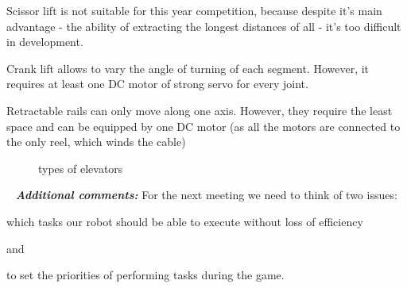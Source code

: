\begin{enumerate*}
		Scissor lift is not suitable for this year competition, because despite it's main advantage - the ability of extracting the longest distances of all - it's too difficult in development.
		
		Crank lift allows to vary the angle of turning of each segment. However, it requires at least one DC motor of strong servo for every joint.
		
		Retractable rails can only move along one axis. However, they require the least space and can be equipped by one DC motor (as all the motors are connected to the only reel, which winds the cable)
		\begin{figure}[H]
			\begin{minipage}[h]{1\linewidth}
				\caption{types of elevators}
			\end{minipage}
		\end{figure}
		
	\end{enumerate*}
	
	 \newline
	\textit{\textbf{Additional comments:}} For the next meeting we need to think of two issues:
	\begin{enumerate*}
		\item which tasks our robot should be able to execute without loss of efficiency
		
		and
		
		\item to set the priorities of performing tasks during the game.
		
	\end{enumerate*}
	
	
	
	\fillpage